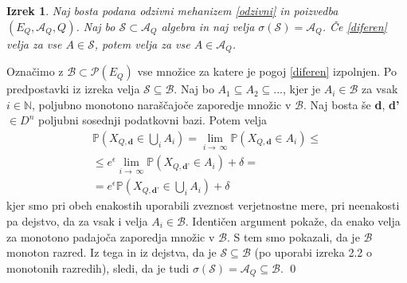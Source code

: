 \documentclass[12pt,a4paper]{amsart}
\theoremstyle{definition} %
\theoremstyle{plain} %
\newtheorem{izrek}[definicija]{Izrek}
\begin{document}
\begin{izrek}
 Naj bosta podana odzivni mehanizem \eqref{odzivni} in poizvedba $(E_Q, \mathcal{A}_Q, Q)$. Naj bo $\mathcal{S} \subset \mathcal{A}_Q$ algebra in naj velja $\sigma(\mathcal{S}) = \mathcal{A}_Q$. Če \eqref{diferen} velja za vse $A \in \mathcal{S}$, potem velja za vse $A \in \mathcal{A}_Q$. 
\end{izrek}
\proof 
Označimo z $\mathcal{B} \subset \mathcal{P}(E_Q) $ vse množice za katere je pogoj \eqref{diferen} izpolnjen. Po predpostavki iz izreka velja $\mathcal{S} \subseteq \mathcal{B}$. Naj bo $A_1 \subseteq A_2 \subseteq ... $, kjer je $A_i \in \mathcal{B}$ za vsak $i \in \mathbb{N}$, poljubno monotono naraščajoče zaporedje množic v $\mathcal{B}$. Naj bosta še \textbf{d}, \textbf{d'} $\in D^n$ poljubni sosednji podatkovni bazi. Potem velja 
\begin{gather*}
\mathbb{P}(X_{Q,\textbf{d}} \in \bigcup_{i} A_i) = \lim_{i \to\ \infty} \mathbb{P}(X_{Q,\textbf{d}} \in A_i)  \leq \\
\leq  e^\epsilon\lim_{i \to\ \infty} \mathbb{P}(X_{Q,\textbf{d'}} \in A_i) + \delta = \\
=  e^\epsilon \mathbb{P}(X_{Q,\textbf{d'}} \in \bigcup_{i} A_i) + \delta
\end{gather*}
kjer smo pri obeh enakostih uporabili zveznost verjetnostne mere, pri neenakosti pa dejstvo, da za vsak i velja $A_i \in \mathcal{B}$. Identičen argument pokaže, da enako velja za monotono padajoča zaporedja množic v $\mathcal{B}$. S tem smo pokazali, da je $\mathcal{B}$ monoton razred. Iz tega in iz dejstva, da je $\mathcal{S} \subseteq \mathcal{B}$ (po uporabi izreka 2.2  o monotonih razredih), sledi, da je tudi $\sigma(\mathcal{S}) = \mathcal{A}_Q \subseteq \mathcal{B}$.
\qed
\newline
\end{document}
